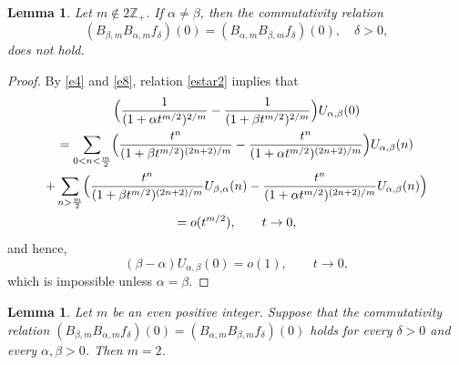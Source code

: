 \documentclass[12pt]{amsart}
\numberwithin{equation}{section}
\newtheorem{lemma}[thm]{Lemma}
\theoremstyle{plain}
\numberwithin{equation}{section}
\begin{document}
\begin{lemma}\label{mnoneven} Let $m\not\in 2\mathbb Z_+$. If $\alpha\not=\beta$, then the commutativity relation 
\begin{equation}
(B_{\beta,m}B_{\alpha,m}f_\delta)(0)=(B_{\alpha,m} B_{\beta,m}f_\delta)(0),  \quad \delta>0,
\label{estar2}
\end{equation}
does not hold.
\end{lemma}

\begin{proof} 
By \eqref{e4} and \eqref{e8}, relation \eqref{estar2} implies that 
\begin{multline*}
\Bigl(\frac{1}{(1+\alpha t^{m/2})^{2/m}}-\frac{1}{(1+\beta t^{m/2})^{2/m}}\Bigr)U_{\alpha,\beta}(0)\\=
\sum_{0<n<\frac{m}2} \Bigl(\frac{t^n}{(1+\beta t^{m/2})^{(2n+2)/m}}-\frac{t^n}{(1+\alpha t^{m/2})^{(2n+2)/m}}\Bigr)U_{\alpha,\beta}(n)\\+
\sum_{n>\frac{m}2}  \Bigl(\frac{t^n}{(1+\beta t^{m/2})^{(2n+2)/m}}U_{\beta,\alpha}(n)-\frac{t^n}{(1+\alpha t^{m/2})^{(2n+2)/m}}U_{\alpha,\beta}(n)\Bigr)\\=o(t^{m/2}),\qquad t\to 0,
\end{multline*}
and hence,
$$
(\beta-\alpha)U_{\alpha,\beta}(0)=o(1),\qquad t\to 0,
$$
which is impossible unless $\alpha=\beta$.
\end{proof}

\begin{lemma}\label{moments} Let $m$ be an even positive integer. Suppose that the commutativity relation $(B_{\beta,m}B_{\alpha,m}f_\delta)(0)=(B_{\alpha,m}B_{\beta,m}f_\delta)(0)$
holds for every $\delta>0$ and every $\alpha,\beta>0$. Then $m=2$. 
\end{lemma}
\end{document}
